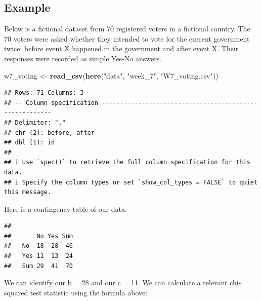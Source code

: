 \documentclass[
]{book}
\newenvironment{Shaded}{\begin{snugshade}}{\end{snugshade}}
\newcommand{\FunctionTok}[1]{\textcolor[rgb]{0.13,0.29,0.53}{\textbf{#1}}}
\newcommand{\NormalTok}[1]{#1}
\newcommand{\OtherTok}[1]{\textcolor[rgb]{0.56,0.35,0.01}{#1}}
\newcommand{\SpecialCharTok}[1]{\textcolor[rgb]{0.81,0.36,0.00}{\textbf{#1}}}
\newcommand{\StringTok}[1]{\textcolor[rgb]{0.31,0.60,0.02}{#1}}
\begin{document}
\subsection{Example}\label{example-1}

Below is a fictional dataset from 70 registered voters in a fictional country. The 70 voters were asked whether they intended to vote for the current government twice: before event X happened in the government and after event X. Their responses were recorded as simple Yes-No answers.

\begin{Shaded}
\begin{Highlighting}[]
\NormalTok{w7\_voting }\OtherTok{\textless{}{-}} \FunctionTok{read\_csv}\NormalTok{(}\FunctionTok{here}\NormalTok{(}\StringTok{"data"}\NormalTok{, }\StringTok{"week\_7"}\NormalTok{, }\StringTok{"W7\_voting.csv"}\NormalTok{))}
\end{Highlighting}
\end{Shaded}

\begin{verbatim}
## Rows: 71 Columns: 3
## -- Column specification --------------------------------------------------------
## Delimiter: ","
## chr (2): before, after
## dbl (1): id
## 
## i Use `spec()` to retrieve the full column specification for this data.
## i Specify the column types or set `show_col_types = FALSE` to quiet this message.
\end{verbatim}

Here is a contingency table of our data:

\begin{Shaded}
\end{Shaded}

\begin{verbatim}
##      
##       No Yes Sum
##   No  18  28  46
##   Yes 11  13  24
##   Sum 29  41  70
\end{verbatim}

We can identify our b = 28 and our c = 11. We can calculate a relevant chi-squared test statistic using the formula above:
\end{document}
